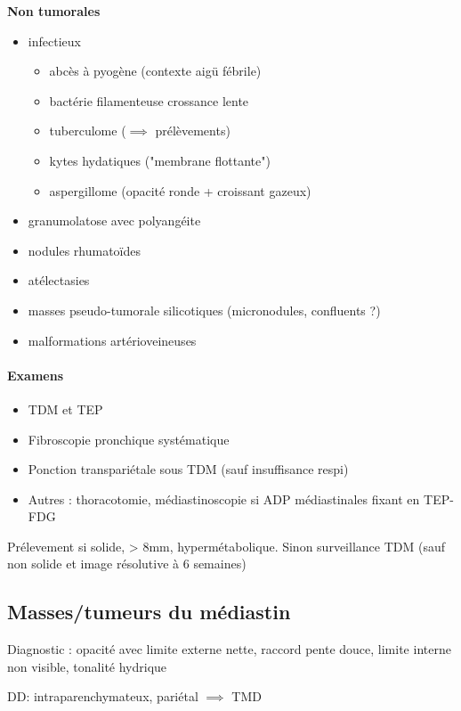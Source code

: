 \textbf{Non tumorales}
\begin{itemize}
\item infectieux 
  \begin{itemize}
  \item abcès à pyogène (contexte aigü fébrile)
  \item bactérie filamenteuse crossance lente
  \item tuberculome ($\implies$ prélèvements)
  \item kytes hydatiques ("membrane flottante")
  \item aspergillome (opacité ronde + croissant gazeux)
  \end{itemize}
\item granumolatose avec polyangéite
\item nodules rhumatoïdes
\item atélectasies
\item masses pseudo-tumorale silicotiques (micronodules, confluents ?)
\item malformations artérioveineuses
\end{itemize}

\paragraph{Examens}
\begin{itemize}
\item TDM et TEP
\item Fibroscopie pronchique systématique
\item Ponction transpariétale sous TDM (sauf insuffisance respi)
\item Autres : thoracotomie, médiastinoscopie si ADP médiastinales fixant en TEP-FDG
\end{itemize}
Prélevement si solide, > 8mm, hypermétabolique. Sinon surveillance TDM (sauf non solide et image résolutive à 6 semaines)

\subsection{Masses/tumeurs du médiastin}
Diagnostic : opacité avec limite externe nette, raccord pente douce, limite interne non
visible, tonalité hydrique

DD: intraparenchymateux, pariétal $\implies$ TMD

